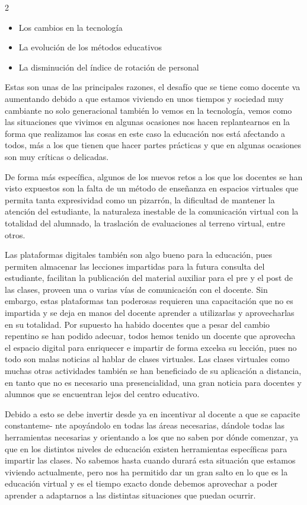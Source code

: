 \documentclass[12pt,spanish,Letterpaper,openany]{book}
\providecommand{\tightlist}{%
  \setlength{\itemsep}{0pt}\setlength{\parskip}{0pt}}
\begin{document}
\begin {multicols}{2}
\begin{itemize}
\tightlist
\item
  Los cambios en la tecnología
\item
  La evolución de los métodos educativos
\item
  La disminución del índice de rotación de personal
\end{itemize}

Estas son unas de las principales razones, el desafío que se tiene como docente va aumentando debido a que estamos viviendo en unos tiempos y sociedad muy cambiante no solo generacional también lo vemos en la tecnología, vemos como las situaciones que vivimos en algunas ocasiones nos hacen replantearnos en la forma que realizamos las cosas en este caso la educación nos está afectando a todos, más a los que tienen que hacer partes prácticas y que en algunas ocasiones son muy críticas o delicadas.

De forma más específica, algunos de los nuevos retos a los que los docentes se han visto expuestos son la falta de un método de enseñanza en espacios virtuales que permita tanta expresividad como un pizarrón, la dificultad de mantener la atención del estudiante, la naturaleza inestable de la comunicación virtual con la totalidad del alumnado, la traslación de evaluaciones al terreno virtual, entre otros.

Las plataformas digitales también son algo bueno para la educación, pues permiten almacenar las lecciones impartidas para la futura consulta del estudiante, facilitan la publicación del material auxiliar para el pre y el post de las clases, proveen una o varias vías de comunicación con el docente. Sin embargo, estas plataformas tan poderosas requieren una capacitación que no es impartida y se deja en manos del docente aprender a utilizarlas y aprovecharlas en su totalidad. Por supuesto ha habido docentes que a pesar del cambio repentino se han podido adecuar, todos hemos tenido un docente que aprovecha el espacio digital para enriquecer e impartir de forma excelsa su lección, pues no todo son malas noticias al hablar de clases virtuales. Las clases virtuales como muchas otras actividades también se han beneficiado de su aplicación a distancia, en tanto que no es necesario una presencialidad, una gran noticia para docentes y alumnos que se encuentran lejos del centro educativo.

Debido a esto se debe invertir desde ya en incentivar al docente a que se capacite constanteme-
nte apoyándolo en todas las áreas necesarias, dándole todas las herramientas necesarias y orientando a los que no saben por dónde comenzar, ya que en los distintos niveles de educación existen herramientas específicas para impartir las clases. No sabemos hasta cuando durará esta situación que estamos viviendo actualmente, pero nos ha permitido dar un gran salto en lo que es la educación virtual y es el tiempo exacto donde debemos aprovechar a poder aprender a adaptarnos a las distintas situaciones que puedan ocurrir.


\end{multicols}
\end{document}
